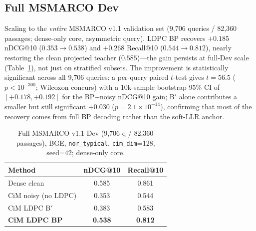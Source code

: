 \documentclass[sigconf,review,anonymous]{acmart}
\begin{document}
\subsection{Full MSMARCO Dev}
Scaling to the \emph{entire} MSMARCO v1.1 validation set (9{,}706 queries / 82{,}360 passages; dense-only core, asymmetric query), LDPC BP recovers $+0.185$ nDCG@10 ($0.353\rightarrow0.538$) and $+0.268$ Recall@10 ($0.544\rightarrow0.812$), nearly restoring the clean projected teacher ($0.585$)---the gain persists at full-Dev scale (Table~\ref{tab:fulldev}), not just on stratified subsets.
The improvement is statistically significant across all 9{,}706 queries: a per-query paired $t$-test gives $t{=}56.5$ ($p<10^{-300}$; Wilcoxon concurs) with a 10k-sample bootstrap 95\% CI of $[+0.178,+0.192]$ for the BP$-$noisy nDCG@10 gain; B$'$ alone contributes a smaller but still significant $+0.030$ ($p{=}2.1{\times}10^{-14}$), confirming that most of the recovery comes from full BP decoding rather than the soft-LLR anchor.
\begin{table}[t]
\caption{Full MSMARCO v1.1 Dev (9{,}706 q / 82{,}360 passages), BGE, \texttt{nor\_typical}, \texttt{cim\_dim}=128, seed=42; dense-only core.}
\label{tab:fulldev}
\small
\setlength{\tabcolsep}{5pt}
\begin{tabular}{lcc}
\toprule
Method & nDCG@10 & Recall@10 \\
\midrule
Dense clean & 0.585 & 0.861 \\
CiM noisy (no LDPC) & 0.353 & 0.544 \\
CiM LDPC B$'$ & 0.383 & 0.583 \\
\textbf{CiM LDPC BP} & \textbf{0.538} & \textbf{0.812} \\
\bottomrule
\end{tabular}
\end{table}
\end{document}
